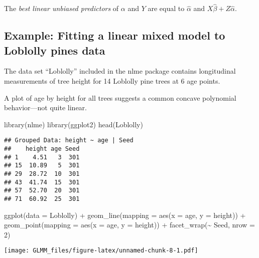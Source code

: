 \documentclass[
]{book}
\newenvironment{Shaded}{\begin{snugshade}}{\end{snugshade}}
\newcommand{\AttributeTok}[1]{\textcolor[rgb]{0.77,0.63,0.00}{#1}}
\newcommand{\DecValTok}[1]{\textcolor[rgb]{0.00,0.00,0.81}{#1}}
\newcommand{\FunctionTok}[1]{\textcolor[rgb]{0.00,0.00,0.00}{#1}}
\newcommand{\NormalTok}[1]{#1}
\newcommand{\SpecialCharTok}[1]{\textcolor[rgb]{0.00,0.00,0.00}{#1}}
\begin{document}
The \emph{best linear unbiased predictors} of \(\alpha\) and \(Y\) are equal to \(\hat\alpha\) and \(X\hat\beta + Z\hat\alpha\).

\hypertarget{example-fitting-a-linear-mixed-model-to-loblolly-pines-data}{%
\subsection{Example: Fitting a linear mixed model to Loblolly pines data}\label{example-fitting-a-linear-mixed-model-to-loblolly-pines-data}}

The data set ``Loblolly'' included in the nlme package contains longitudinal measurements of tree height for 14 Loblolly pine trees at 6 age points.

A plot of age by height for all trees suggests a common concave polynomial behavior---not quite linear.

\begin{Shaded}
\begin{Highlighting}[]
\FunctionTok{library}\NormalTok{(nlme)}
\FunctionTok{library}\NormalTok{(ggplot2)}
\FunctionTok{head}\NormalTok{(Loblolly)}
\end{Highlighting}
\end{Shaded}

\begin{verbatim}
## Grouped Data: height ~ age | Seed
##    height age Seed
## 1    4.51   3  301
## 15  10.89   5  301
## 29  28.72  10  301
## 43  41.74  15  301
## 57  52.70  20  301
## 71  60.92  25  301
\end{verbatim}

\begin{Shaded}
\begin{Highlighting}[]
\FunctionTok{ggplot}\NormalTok{(}\AttributeTok{data =}\NormalTok{ Loblolly) }\SpecialCharTok{+} 
  \FunctionTok{geom\_line}\NormalTok{(}\AttributeTok{mapping =} \FunctionTok{aes}\NormalTok{(}\AttributeTok{x =}\NormalTok{ age, }\AttributeTok{y =}\NormalTok{ height)) }\SpecialCharTok{+} 
  \FunctionTok{geom\_point}\NormalTok{(}\AttributeTok{mapping =} \FunctionTok{aes}\NormalTok{(}\AttributeTok{x =}\NormalTok{ age, }\AttributeTok{y =}\NormalTok{ height)) }\SpecialCharTok{+} 
  \FunctionTok{facet\_wrap}\NormalTok{(}\SpecialCharTok{\textasciitilde{}}\NormalTok{ Seed, }\AttributeTok{nrow =} \DecValTok{2}\NormalTok{)}
\end{Highlighting}
\end{Shaded}

\texttt{[image: GLMM\_files/figure-latex/unnamed-chunk-8-1.pdf]}
\end{document}
